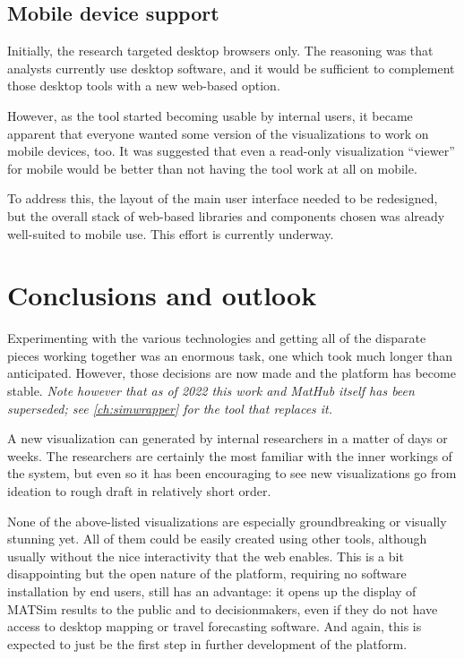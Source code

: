 \hypertarget{mathub-mobile-device-support}{%
\subsection{Mobile device support}\label{mobile-device-support}}

Initially, the research targeted desktop browsers only. The reasoning was that analysts currently use desktop software, and it would be sufficient to complement those desktop tools with a new web-based option.

However, as the tool started becoming usable by internal users, it became apparent that everyone wanted some version of the visualizations to work on mobile devices, too. It was suggested that even a read-only visualization ``viewer'' for mobile would be better than not having the tool work at all on mobile.

To address this, the layout of the main user interface needed to be redesigned, but the overall stack of web-based libraries and components chosen was already well-suited to mobile use. This effort is currently underway.

\hypertarget{mathub-conclusions-and-outlook}{%
\section{Conclusions and outlook}\label{conclusions-and-outlook}}

Experimenting with the various technologies and getting all of the disparate pieces working together was an enormous task, one which took much longer than anticipated. However, those decisions are now made and the platform has become stable. \emph{Note however that as of 2022 this work and MatHub itself has been superseded; see \autoref{ch:simwrapper} for the tool that replaces it.}

A new visualization can generated by internal researchers in a matter of days or weeks. The researchers are certainly the most familiar with the inner workings of the system, but even so it has been encouraging to see new visualizations go from ideation to rough draft in relatively short order.

None of the above-listed visualizations are especially groundbreaking or visually stunning yet. All of them could be easily created using other tools, although usually without the nice interactivity that the web enables. This is a bit disappointing but the open nature of the platform, requiring no software installation by end users, still has an advantage: it opens up the display of MATSim results to the public and to decisionmakers, even if they do not have access to desktop mapping or travel forecasting software. And again, this is expected to just be the first step in further development of the platform.

